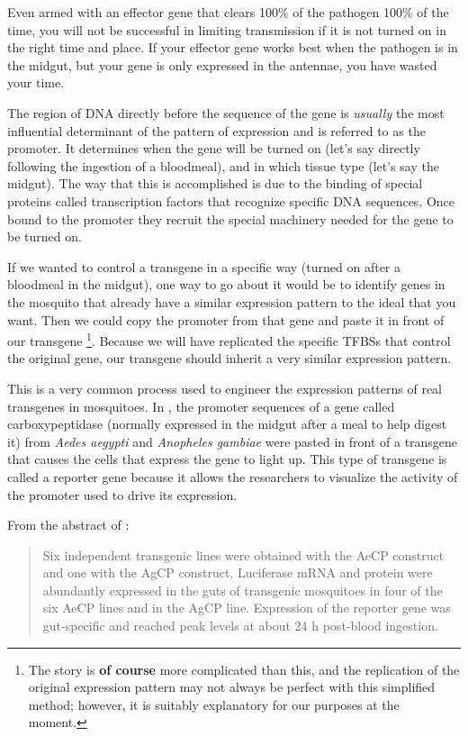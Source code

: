 Even armed with an effector gene that clears 100\% of the pathogen 100\% of the time, you will not be successful in limiting transmission if it is not turned on in the right time and place.
If your effector gene works best when the pathogen is in the midgut, but your gene is only expressed in the antennae, you have wasted your time.

The region of DNA directly before the sequence of the gene is \emph{usually} the most influential determinant of the pattern of expression and is referred to as the promoter.
It determines when the gene will be turned on (let's say directly following the ingestion of a bloodmeal), and in which tissue type (let's say the midgut).
The way that this is accomplished is due to the binding of special proteins called transcription factors that recognize specific DNA sequences.
Once bound to the promoter they recruit the special machinery needed for the gene to be turned on.

If we wanted to control a transgene in a specific way (turned on after a bloodmeal in the midgut), one way to go about it would be to identify genes in the mosquito that already have a similar expression pattern to the ideal that you want.
Then we could copy the promoter from that gene and paste it in front of our transgene
\footnote{The story is \textbf{of course} more complicated than this, and the replication of the
    original expression pattern may not always be perfect with this simplified method; however,
    it is suitably explanatory for our purposes at the moment.}.
Because we will have replicated the specific \glspl{TFBS} that control the original gene, our transgene should inherit a very similar expression pattern.

This is a very common process used to engineer the expression patterns of real transgenes in mosquitoes.
In \cite{Moreira2000}, the promoter sequences of a gene called carboxypeptidase (normally expressed in the midgut after a meal to help digest it) from \emph{Aedes aegypti} and \emph{Anopheles gambiae} were pasted in front of a transgene that causes the cells that express the gene to light up.
This type of transgene is called a \gls{reporter gene} because it allows the researchers to visualize the activity of the promoter used to drive its expression.

From the abstract of \cite{Moreira2000}:

\begin{quote}
Six independent transgenic lines were obtained with the AeCP construct and one with the
AgCP
construct.
Luciferase mRNA and protein were abundantly expressed in the
guts of transgenic mosquitoes in four of the six AeCP lines and in the
AgCP line.
Expression of the reporter gene was gut-specific and reached
peak levels at about 24 h post-blood ingestion.
\end{quote}

